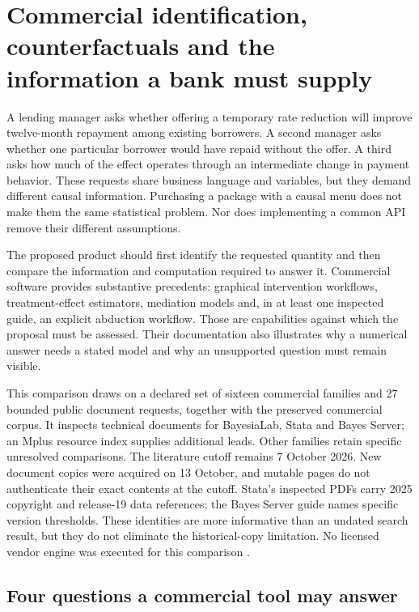 \chapter{Commercial identification, counterfactuals and the information a bank must supply}
\label{exec13:commercial-identification}

A lending manager asks whether offering a temporary rate reduction will improve
twelve-month repayment among existing borrowers. A second manager asks whether
one particular borrower would have repaid without the offer. A third asks how
much of the effect operates through an intermediate change in payment behavior.
These requests share business language and variables, but they demand different
causal information. Purchasing a package with a causal menu does not make them
the same statistical problem. Nor does implementing a common API remove their
different assumptions.

The proposed product should first identify the requested quantity and then
compare the information and computation required to answer it. Commercial
software provides substantive precedents: graphical intervention workflows,
treatment-effect estimators, mediation models and, in at least one inspected
guide, an explicit abduction workflow. Those are capabilities against which the
proposal must be assessed. Their documentation also illustrates why a numerical
answer needs a stated model and why an unsupported question must remain visible.

This comparison draws on a declared set of sixteen commercial families and
27 bounded public document requests, together with the preserved commercial
corpus. It inspects technical documents for BayesiaLab, Stata and Bayes Server;
an Mplus resource index supplies additional leads. Other families retain
specific unresolved comparisons. The literature cutoff remains 7 October 2026.
New document copies were acquired on 13 October, and mutable pages do not
authenticate their exact contents at the cutoff. Stata's inspected PDFs carry
2025 copyright and release-19 data references; the Bayes Server guide names
specific version thresholds. These identities are more informative than an
undated search result, but they do not eliminate the historical-copy limitation.
No licensed vendor engine was executed for this comparison
\citep{exec13_ci_scope}.

\section{Four questions a commercial tool may answer}

